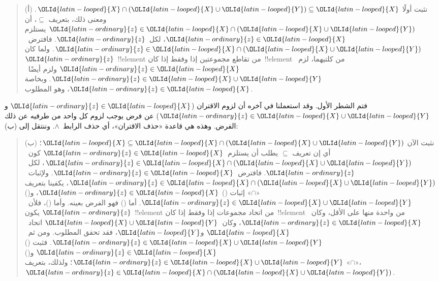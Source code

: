 \documentclass[../../../include/open-logic-section]{subfiles}
\begin{document}
\begin{explain}
\begin{quote}
(أ) نثبت أولًا ${\OLId{latin-looped}{X}} \cap ({\OLId{latin-looped}{X}} \cup {\OLId{latin-looped}{Y}}) \subseteq {\OLId{latin-looped}{X}}$. ومعنى ذلك، بتعريف
$\subseteq$، أن ${\OLId{latin-ordinary}{z}} \in {\OLId{latin-looped}{X}} \cap ({\OLId{latin-looped}{X}} \cup {\OLId{latin-looped}{Y}})$ يستلزم
${\OLId{latin-ordinary}{z}} \in {\OLId{latin-looped}{X}}$، لكل~${\OLId{latin-ordinary}{z}}$. فافترض~${\OLId{latin-ordinary}{z}} \in {\OLId{latin-looped}{X}} \cap ({\OLId{latin-looped}{X}} \cup {\OLId{latin-looped}{Y}})$. ولما كان
${\OLId{latin-ordinary}{z}}$~!!{element} من تقاطع مجموعتين إذا وفقط إذا كان~!!{element} من
  كلتيهما، لزم~${\OLId{latin-ordinary}{z}} \in {\OLId{latin-looped}{X}}$ ولزم أيضًا~${\OLId{latin-ordinary}{z}} \in {\OLId{latin-looped}{X}} \cup {\OLId{latin-looped}{Y}}$. وبخاصة
${\OLId{latin-ordinary}{z}} \in {\OLId{latin-looped}{X}}$، وهو المطلوب.
\end{quote}

فتم الشطر الأول. وقد استعملنا في آخره أن لزوم الاقتران
(${\OLId{latin-ordinary}{z}} \in {\OLId{latin-looped}{X}}$ و${\OLId{latin-ordinary}{z}} \in {\OLId{latin-looped}{X}} \cup {\OLId{latin-looped}{Y}}$) عن فرض يوجب لزوم كل واحد من طرفيه عن
ذلك الفرض. وهذه هي قاعدة «حذف الاقتران»، أي حذف الرابط~$\land$. وننتقل
إلى (ب):

\begin{quote}
(ب) نثبت الآن ${\OLId{latin-looped}{X}} \subseteq {\OLId{latin-looped}{X}} \cap ({\OLId{latin-looped}{X}} \cup {\OLId{latin-looped}{Y}})$؛ أي إن تعريف
$\subseteq$ يطلب أن يستلزم~${\OLId{latin-ordinary}{z}} \in {\OLId{latin-looped}{X}}$ كون~${\OLId{latin-ordinary}{z}} \in {\OLId{latin-looped}{X}} \cap
({\OLId{latin-looped}{X}} \cup {\OLId{latin-looped}{Y}})$، لكل~${\OLId{latin-ordinary}{z}}$. فافترض~${\OLId{latin-ordinary}{z}} \in {\OLId{latin-looped}{X}}$. ولإثبات~${\OLId{latin-ordinary}{z}} \in {\OLId{latin-looped}{X}}
\cap ({\OLId{latin-looped}{X}} \cup {\OLId{latin-looped}{Y}})$، يكفينا بتعريف «$\cap$» إثبات ()
${\OLId{latin-ordinary}{z}} \in {\OLId{latin-looped}{X}}$، و() ${\OLId{latin-ordinary}{z}} \in {\OLId{latin-looped}{X}} \cup {\OLId{latin-looped}{Y}}$. أما () فهو الفرض بعينه. وأما ()،
فلأن~${\OLId{latin-ordinary}{z}}$ يكون~!!{element} من اتحاد مجموعات إذا وفقط إذا كان~!!{element}
من واحدة منها على الأقل، وكان~${\OLId{latin-ordinary}{z}} \in {\OLId{latin-looped}{X}}$، وكان~${\OLId{latin-looped}{X}} \cup {\OLId{latin-looped}{Y}}$ اتحاد~${\OLId{latin-looped}{X}}$
و${\OLId{latin-looped}{Y}}$، فقد تحقق المطلوب. ومن ثم~${\OLId{latin-ordinary}{z}} \in {\OLId{latin-looped}{X}} \cup {\OLId{latin-looped}{Y}}$. فثبت ()
${\OLId{latin-ordinary}{z}} \in {\OLId{latin-looped}{X}}$ و() ${\OLId{latin-ordinary}{z}} \in {\OLId{latin-looped}{X}} \cup {\OLId{latin-looped}{Y}}$؛ ولذلك، بتعريف «$\cap$»،
${\OLId{latin-ordinary}{z}} \in {\OLId{latin-looped}{X}} \cap ({\OLId{latin-looped}{X}} \cup {\OLId{latin-looped}{Y}})$.
\end{quote}


\end{explain}
\end{document}
